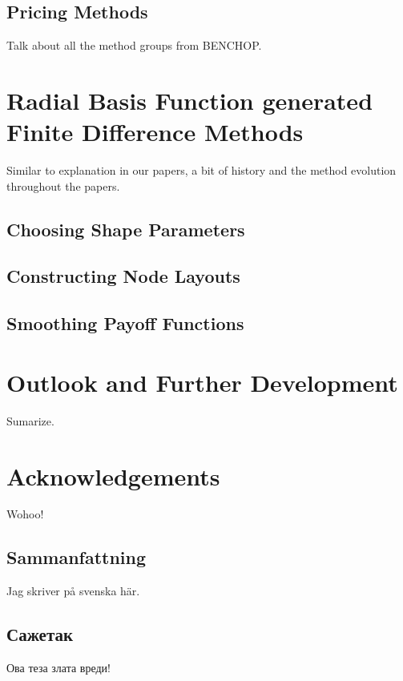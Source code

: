 \documentclass{UUThesisTemplate}
\begin{document}
\section{Pricing Methods}
Talk about all the method groups from BENCHOP.
%
%
\chapter{Radial Basis Function generated Finite Difference Methods}
Similar to explanation in our papers, a bit of history and the method evolution throughout the papers.
\section{Choosing Shape Parameters}
\section{Constructing Node Layouts}
\section{Smoothing Payoff Functions}
%
%
\chapter{Outlook and Further Development}
Sumarize.

\backmatter
%    
%    

\chapter{Acknowledgements}
Wohoo!

\begin{swedish}
\chapter*{Sammanfattning}
Jag skriver på svenska här.
\end{swedish}

\begin{serbian}
\chapter*{Сажетак}
\noindent Ова теза злата вреди!
\end{serbian}
\end{document}
